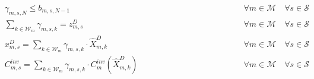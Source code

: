 \documentclass{article}
\newcommand{\cM}{{\mathcal M}}
\newcommand{\cS}{{\mathcal S}}
\newcommand{\cW}{{\mathcal W}}
\begin{document}
{\begin{align}
		& \gamma_{m,s,N} \leq b_{m,s,N-1}  & \hspace{5cm} \forall m \in \cM \quad \forall s \in \cS \label{eq:Gamma_b_n}\\
		& \sum_{k \in \cW_m} \gamma_{m,s,k} = z_{m,s}^D & \hspace{5cm} \forall m \in \cM \quad \forall s \in \cS \label{eq:Active_gamma}\\
		& x_{m,s}^D = \sum_{k \in \cW_m} \gamma_{m,s,k} \cdot \hat{X}_{m,k}^D & \hspace{5cm} \forall m \in \cM \quad \forall s \in \cS \label{eq:Convex_xD}\\
		& C_{m,s}^{inv} = \sum_{k \in \cW_m} \gamma_{m,s,k} \cdot C_{m}^{inv}(\hat{X}_{m,k}^D) & \hspace{5cm} \forall m \in \cM \quad \forall s \in \cS \label{eq:Convex_Cinv}
		\end{align}				

}
\end{document}
